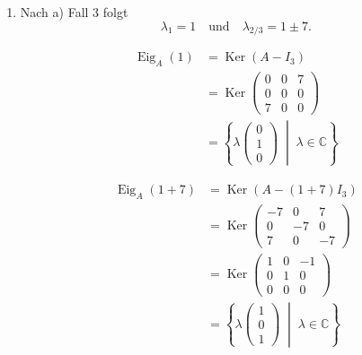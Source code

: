 \documentclass[a4paper,12pt]{article}
\begin{document}
\begin{enumerate}[label=\alph*)]
    \item
    Nach a) Fall 3 folgt
    \[
        \lambda_1 = 1 \quad\text{und}\quad \lambda_{2/3} = 1 \pm 7.
    \]

    \begin{align*}
        \operatorname{Eig}_A(1) &= \operatorname{Ker}(A - I_3) \\
            &= \operatorname{Ker}\begin{pmatrix}
                0 & 0 & 7 \\
                0 & 0 & 0 \\
                7 & 0 & 0
              \end{pmatrix} \\
            &= \left\{ \lambda \begin{pmatrix} 0 \\ 1 \\ 0 \end{pmatrix} \;\middle|\; \lambda \in \mathbb{C} \right\}
    \end{align*}

    \begin{align*}
        \operatorname{Eig}_A(1+7) &= \operatorname{Ker}(A - (1+7)I_3) \\
            &= \operatorname{Ker}\begin{pmatrix}
                -7 & 0  & 7 \\
                0  & -7 & 0 \\
                7  & 0  & -7
              \end{pmatrix} \\
            &= \operatorname{Ker}\begin{pmatrix}
                1 & 0 & -1 \\
                0 & 1 & 0 \\
                0 & 0 & 0
              \end{pmatrix} \\
            &= \left\{ \lambda \begin{pmatrix} 1 \\ 0 \\ 1 \end{pmatrix} \;\middle|\; \lambda \in \mathbb{C} \right\}
    \end{align*}


\end{enumerate}
\end{document}
